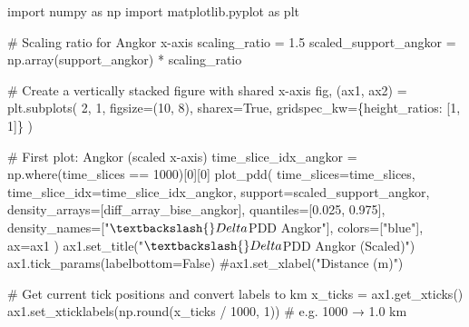 \documentclass[
  11pt,
  letterpaper,
  DIV=11,
  numbers=noendperiod]{scrartcl}
\newenvironment{Shaded}{\begin{snugshade}}{\end{snugshade}}
\newcommand{\BuiltInTok}[1]{\textcolor[rgb]{0.00,0.23,0.31}{#1}}
\newcommand{\CommentTok}[1]{\textcolor[rgb]{0.37,0.37,0.37}{#1}}
\newcommand{\DecValTok}[1]{\textcolor[rgb]{0.68,0.00,0.00}{#1}}
\newcommand{\FloatTok}[1]{\textcolor[rgb]{0.68,0.00,0.00}{#1}}
\newcommand{\ImportTok}[1]{\textcolor[rgb]{0.00,0.46,0.62}{#1}}
\newcommand{\NormalTok}[1]{\textcolor[rgb]{0.00,0.23,0.31}{#1}}
\newcommand{\OperatorTok}[1]{\textcolor[rgb]{0.37,0.37,0.37}{#1}}
\newcommand{\StringTok}[1]{\textcolor[rgb]{0.13,0.47,0.30}{#1}}
\newcommand{\VariableTok}[1]{\textcolor[rgb]{0.07,0.07,0.07}{#1}}
\begin{document}
\begin{Shaded}
\begin{Highlighting}[]
\ImportTok{import}\NormalTok{ numpy }\ImportTok{as}\NormalTok{ np}
\ImportTok{import}\NormalTok{ matplotlib.pyplot }\ImportTok{as}\NormalTok{ plt}

\CommentTok{\# Scaling ratio for Angkor x{-}axis}
\NormalTok{scaling\_ratio }\OperatorTok{=} \FloatTok{1.5}
\NormalTok{scaled\_support\_angkor }\OperatorTok{=}\NormalTok{ np.array(support\_angkor) }\OperatorTok{*}\NormalTok{ scaling\_ratio}

\CommentTok{\# Create a vertically stacked figure with shared x{-}axis}
\NormalTok{fig, (ax1, ax2) }\OperatorTok{=}\NormalTok{ plt.subplots(}
    \DecValTok{2}\NormalTok{, }\DecValTok{1}\NormalTok{,}
\NormalTok{    figsize}\OperatorTok{=}\NormalTok{(}\DecValTok{10}\NormalTok{, }\DecValTok{8}\NormalTok{),}
\NormalTok{    sharex}\OperatorTok{=}\VariableTok{True}\NormalTok{,}
\NormalTok{    gridspec\_kw}\OperatorTok{=}\NormalTok{\{}\StringTok{\textquotesingle{}height\_ratios\textquotesingle{}}\NormalTok{: [}\DecValTok{1}\NormalTok{, }\DecValTok{1}\NormalTok{]\}}
\NormalTok{)}

\CommentTok{\# First plot: Angkor (scaled x{-}axis)}
\NormalTok{time\_slice\_idx\_angkor }\OperatorTok{=}\NormalTok{ np.where(time\_slices }\OperatorTok{==} \DecValTok{1000}\NormalTok{)[}\DecValTok{0}\NormalTok{][}\DecValTok{0}\NormalTok{]}
\NormalTok{plot\_pdd(}
\NormalTok{    time\_slices}\OperatorTok{=}\NormalTok{time\_slices,}
\NormalTok{    time\_slice\_idx}\OperatorTok{=}\NormalTok{time\_slice\_idx\_angkor,}
\NormalTok{    support}\OperatorTok{=}\NormalTok{scaled\_support\_angkor,}
\NormalTok{    density\_arrays}\OperatorTok{=}\NormalTok{[diff\_array\_bise\_angkor],}
\NormalTok{    quantiles}\OperatorTok{=}\NormalTok{[}\FloatTok{0.025}\NormalTok{, }\FloatTok{0.975}\NormalTok{],}
\NormalTok{    density\_names}\OperatorTok{=}\NormalTok{[}\StringTok{"$\textbackslash{}Delta$PDD Angkor"}\NormalTok{],}
\NormalTok{    colors}\OperatorTok{=}\NormalTok{[}\StringTok{"blue"}\NormalTok{],}
\NormalTok{    ax}\OperatorTok{=}\NormalTok{ax1}
\NormalTok{)}
\NormalTok{ax1.set\_title(}\StringTok{"$\textbackslash{}Delta$PDD Angkor (Scaled)"}\NormalTok{)}
\NormalTok{ax1.tick\_params(labelbottom}\OperatorTok{=}\VariableTok{False}\NormalTok{)}
\CommentTok{\#ax1.set\_xlabel("Distance (m)")}

\CommentTok{\# Get current tick positions and convert labels to km}
\NormalTok{x\_ticks }\OperatorTok{=}\NormalTok{ ax1.get\_xticks()}
\NormalTok{ax1.set\_xticklabels(np.}\BuiltInTok{round}\NormalTok{(x\_ticks }\OperatorTok{/} \DecValTok{1000}\NormalTok{, }\DecValTok{1}\NormalTok{))  }\CommentTok{\# e.g. 1000 → 1.0 km}


\end{Highlighting}
\end{Shaded}
\end{document}
